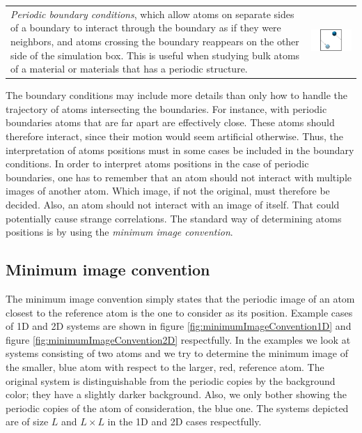 \documentclass[twoside,english]{uiofysmaster}
\begin{document}
\begin{tabular}{p{} p{}}
	 \vspace{0pt} {\it Periodic boundary conditions}, which allow atoms on separate sides of a boundary to interact through the boundary as if they were neighbors, and atoms crossing the boundary reappears on the other side of the simulation box. This is useful when studying bulk atoms of a material or materials that has a periodic structure.
	& \vspace{0pt} \hspace*{-1.3cm} \includegraphics[width=1.3\linewidth]{figures/BoundaryConditions/periodic.pdf}
\end{tabular}
\vspace{10mm}

\noindent
The boundary conditions may include more details than only how to handle the trajectory of atoms intersecting the boundaries. 
For instance, with periodic boundaries atoms that are far apart are effectively close. 
These atoms should therefore interact, since their motion would seem artificial otherwise. 
Thus, the interpretation of atoms positions must in some cases be included in the boundary conditions. 
In order to interpret atoms positions in the case of periodic boundaries, one has to remember that an atom should not interact with multiple images of another atom. 
Which image, if not the original, must therefore be decided. 
Also, an atom should not interact with an image of itself. That could potentially cause strange correlations. 
The standard way of determining atoms positions is by using the {\it minimum image convention}.


\subsection{Minimum image convention}
The minimum image convention simply states that the periodic image of an atom closest to the reference atom is the one to consider as its position. 
Example cases of 1D and 2D systems are shown in figure \ref{fig:minimumImageConvention1D} and figure \ref{fig:minimumImageConvention2D} respectfully. 
In the examples we look at systems consisting of two atoms and we try to determine the minimum image of the smaller, blue atom with respect to the larger, red, reference atom. 
The original system is distinguishable from the periodic copies by the background color; they have a slightly darker background. 
Also, we only bother showing the periodic copies of the atom of consideration, the blue one.  
The systems depicted are of size $L$ and $L\times L$ in the 1D and 2D cases respectfully.
\end{document}
